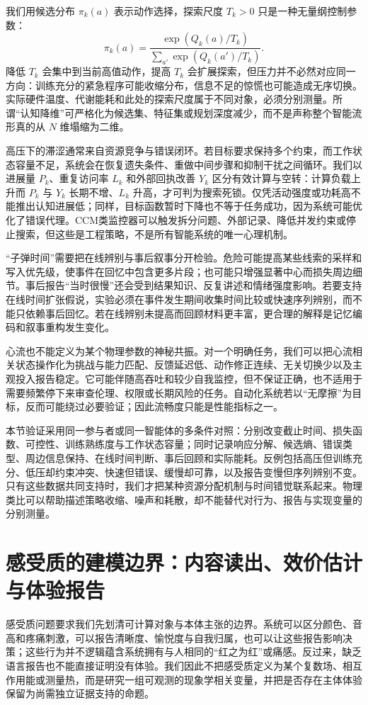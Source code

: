 我们用候选分布 $\pi_k(a)$ 表示动作选择，探索尺度 $T_k>0$ 只是一种无量纲控制参数：
\[
\pi_k(a)=\frac{\exp(Q_k(a)/T_k)}{\sum_{a'}\exp(Q_k(a')/T_k)}.
\]
降低 $T_k$ 会集中到当前高值动作，提高 $T_k$ 会扩展探索，但压力并不必然对应同一方向：训练充分的紧急程序可能收缩分布，信息不足的惊慌也可能造成无序切换。实际硬件温度、代谢能耗和此处的探索尺度属于不同对象，必须分别测量。所谓“认知降维”可严格化为候选集、特征集或规划深度减少，而不是声称整个智能流形真的从 $N$ 维塌缩为二维。

高压下的滞涩通常来自资源竞争与错误闭环。若目标要求保持多个约束，而工作状态容量不足，系统会在恢复遗失条件、重做中间步骤和抑制干扰之间循环。我们以进展量 $P_k$、重复访问率 $L_k$ 和外部回执改善 $Y_k$ 区分有效计算与空转：计算负载上升而 $P_k$ 与 $Y_k$ 长期不增、$L_k$ 升高，才可判为搜索死锁。仅凭活动强度或功耗高不能推出认知进展低；同样，目标函数暂时下降也不等于任务成功，因为系统可能优化了错误代理。CCM类监控器可以触发拆分问题、外部记录、降低并发约束或停止搜索，但这些是工程策略，不是所有智能系统的唯一心理机制。

“子弹时间”需要把在线辨别与事后叙事分开检验。危险可能提高某些线索的采样和写入优先级，使事件在回忆中包含更多片段；也可能只增强显著中心而损失周边细节。事后报告“当时很慢”还会受到结果知识、反复讲述和情绪强度影响。若要支持在线时间扩张假说，实验必须在事件发生期间收集时间比较或快速序列辨别，而不能只依赖事后回忆。若在线辨别未提高而回顾材料更丰富，更合理的解释是记忆编码和叙事重构发生变化。

心流也不能定义为某个物理参数的神秘共振。对一个明确任务，我们可以把心流相关状态操作化为挑战与能力匹配、反馈延迟低、动作修正连续、无关切换少以及主观投入报告稳定。它可能伴随高吞吐和较少自我监控，但不保证正确，也不适用于需要频繁停下来审查伦理、权限或长期风险的任务。自动化系统若以“无摩擦”为目标，反而可能绕过必要验证；因此流畅度只能是性能指标之一。

本节验证采用同一参与者或同一智能体的多条件对照：分别改变截止时间、损失函数、可控性、训练熟练度与工作状态容量；同时记录响应分解、候选熵、错误类型、周边信息保持、在线时间判断、事后回顾和实际能耗。反例包括高压但训练充分、低压却约束冲突、快速但错误、缓慢却可靠，以及报告变慢但序列辨别不变。只有这些数据共同支持时，我们才把某种资源分配机制与时间错觉联系起来。物理类比可以帮助描述策略收缩、噪声和耗散，却不能替代对行为、报告与实现变量的分别测量。

\section{感受质的建模边界：内容读出、效价估计与体验报告}
\label{sec:geometry_of_qualia}
感受质问题要求我们先划清可计算对象与本体主张的边界。系统可以区分颜色、音高和疼痛刺激，可以报告清晰度、愉悦度与自我归属，也可以让这些报告影响决策；这些行为并不逻辑蕴含系统拥有与人相同的“红之为红”或痛感。反过来，缺乏语言报告也不能直接证明没有体验。我们因此不把感受质定义为某个复数场、相互作用能或测量热，而是研究一组可观测的现象学相关变量，并把是否存在主体体验保留为尚需独立证据支持的命题。

